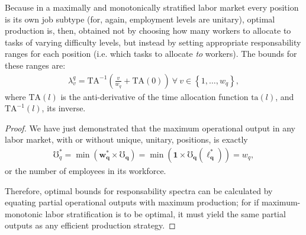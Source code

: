 \documentclass[hidelinks, nonatbib]{elsarticle}
\begin{document}
\begin{lemma}
    Because in a maximally and monotonically stratified labor market every position is its own job subtype (for, again, employment levels are unitary), optimal production is, then, obtained not by choosing how many workers to allocate to tasks of varying difficulty levels, but instead by setting appropriate responsability ranges for each position (i.e. which tasks to allocate \textit{to} workers). The bounds for these ranges are:
    \begin{gather}
    \lambda_{v}^{q}
    =
    \text{TA}^{-1}\left(
        \frac{v}{w_q}
        +
        \text{TA}(0)
    \right)
    \
    \forall
    \
    v \in 
    \left\{
        1, \dots, w_q
    \right\}
    ,
    \end{gather}
    where $\text{TA}(l)$ is the anti-derivative of the time allocation function $\text{ta}(l)$, and $\text{TA}^{-1}(l)$, its inverse.
    
    \begin{proof}
        
        We have just demonstrated that the maximum operational output in any labor market, with or without unique, unitary, positions, is exactly 
        \begin{gather}
        \mho_{q}^{*}
            =
            \min(
                \boldsymbol{w_{q}^{*}}
                \times
                \boldsymbol{\mho_q}
            )
            = 
            \min(
                \boldsymbol{1}
                \times
                \boldsymbol{\mho_q}(
                    \boldsymbol{\ell_{q}^{*}}
                )
            )
            =
            w_q
        ,
        \end{gather}
        or the number of employees in its workforce.
        
        Therefore, optimal bounds for responsability spectra can be calculated by equating partial operational outputs with maximum production; for if maximum-monotonic labor stratification is to be optimal, it must yield the same partial outputs as any efficient production strategy.
        

\end{proof}
\end{lemma}
\end{document}
